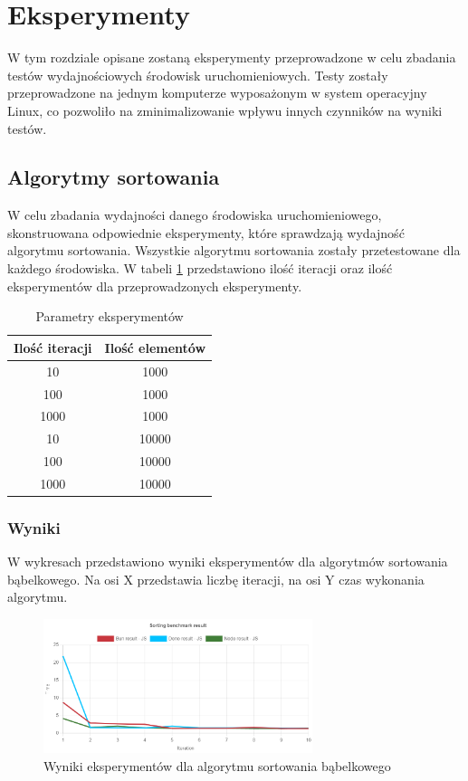 \section{Eksperymenty}
W tym rozdziale opisane zostaną eksperymenty przeprowadzone w celu zbadania testów wydajnościowych środowisk uruchomieniowych. Testy zostały przeprowadzone na jednym komputerze wyposażonym w system operacyjny Linux, co pozwoliło na zminimalizowanie wpływu innych czynników na wyniki testów. 

\subsection{Algorytmy sortowania}
W celu zbadania wydajności danego środowiska uruchomieniowego, skonstruowana odpowiednie eksperymenty, które sprawdzają wydajność algorytmu sortowania. Wszystkie algorytmu sortowania zostały przetestowane dla każdego środowiska. W tabeli \ref{tab:sorting_experiments} przedstawiono ilość iteracji oraz ilość eksperymentów dla przeprowadzonych eksperymenty.

\begin{table}[H]
  \centering
  \begin{tabular}{|c|c|}
    \hline
    \textbf{Ilość iteracji} & \textbf{Ilość elementów} \\ \hline
    10 & 1000 \\ \hline
    100 & 1000 \\ \hline
    1000 & 1000 \\ \hline
    10 & 10000 \\ \hline
    100 & 10000 \\ \hline
    1000 & 10000 \\ \hline
  \end{tabular}
  \caption{Parametry eksperymentów}
  \label{tab:sorting_experiments}
\end{table}

\subsubsection{Wyniki}
W wykresach przedstawiono wyniki eksperymentów dla algorytmów sortowania bąbelkowego. Na osi X przedstawia liczbę iteracji, na osi Y czas wykonania algorytmu. 

\begin{figure}[h]
  \centering
  \includegraphics[width=0.7\textwidth]{Figures/sorting/bubble/e1_js.png}
  \caption{Wyniki eksperymentów dla algorytmu sortowania bąbelkowego}
  \label{fig:bubble_sorting_e1}
\end{figure}

